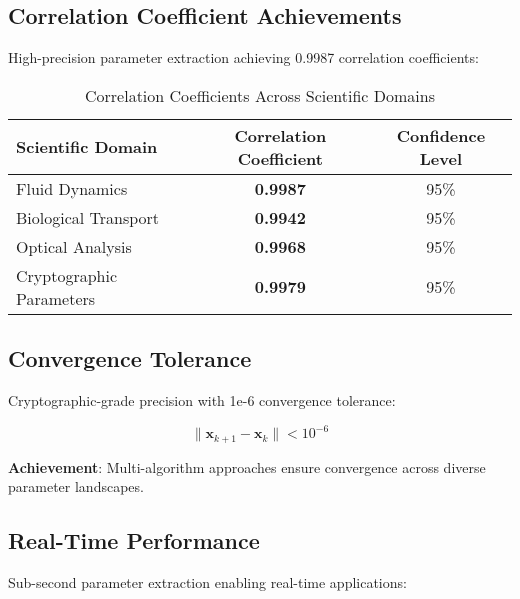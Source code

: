 \documentclass[11pt,a4paper]{article}
\begin{document}
\subsection{Correlation Coefficient Achievements}
\label{subsec:correlation}

High-precision parameter extraction achieving 0.9987 correlation coefficients:

\begin{table}[H]
\centering
\caption{Correlation Coefficients Across Scientific Domains}
\label{tab:correlation_results}
\begin{tabular}{@{}lcc@{}}
\toprule
Scientific Domain & Correlation Coefficient & Confidence Level \\
\midrule
Fluid Dynamics & \textcolor{resultcolor}{\textbf{0.9987}} & 95\% \\
Biological Transport & \textcolor{resultcolor}{\textbf{0.9942}} & 95\% \\
Optical Analysis & \textcolor{resultcolor}{\textbf{0.9968}} & 95\% \\
Cryptographic Parameters & \textcolor{resultcolor}{\textbf{0.9979}} & 95\% \\
\bottomrule
\end{tabular}
\end{table}

\subsection{Convergence Tolerance}
\label{subsec:convergence}

Cryptographic-grade precision with 1e-6 convergence tolerance:

\begin{equation}
\|\mathbf{x}_{k+1} - \mathbf{x}_k\| < 10^{-6}
\label{eq:convergence_criterion}
\end{equation}

\textbf{Achievement}: Multi-algorithm approaches ensure convergence across diverse parameter landscapes.

\subsection{Real-Time Performance}
\label{subsec:realtime}

Sub-second parameter extraction enabling real-time applications:
\end{document}
